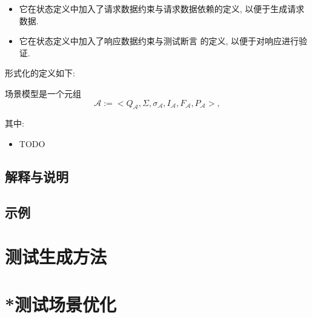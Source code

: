             \begin{itemize}
                \item 它在状态定义中加入了请求数据约束与请求数据依赖的定义, 以便于生成请求数据.
                
                \item 它在状态定义中加入了响应数据约束与测试断言 的定义, 以便于对响应进行验证.
            \end{itemize}
            
            形式化的定义如下:
            
            \begin{definition}
                \label{def:our}
                场景模型是一个元组
                \begin{equation}
                     \mathcal{A} := <Q_{\mathcal{A}}, \Sigma, \sigma_{\mathcal{A}}, I_{\mathcal{A}}, F_{\mathcal{A}}, P_{\mathcal{A}}>,
                \end{equation}
                
                其中:
                \begin{itemize}
                    \item TODO
                \end{itemize}
            \end{definition}
        
        \subsection{解释与说明}
        
        \subsection{示例}
    
    \section{测试生成方法}
    
    \section{*测试场景优化}

